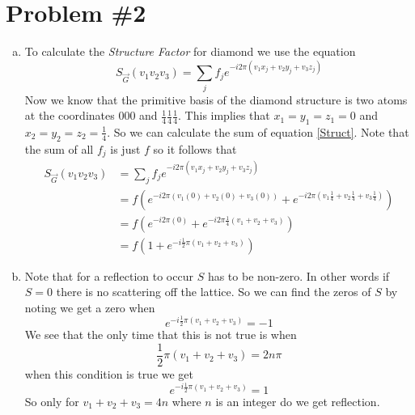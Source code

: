 \documentclass[11pt]{article}
\numberwithin{equation}{section}
\begin{document}
\section{Problem \#2}
\begin{enumerate}[(a)]
\item
To calculate the \emph{Structure Factor} for diamond we use the equation
\begin{equation}
S_{\vec{G}}(v_1v_2v_3) = \sum_{j}f_je^{-i2\pi(v_1x_j+v_2y_j+v_3z_j)}
\label{Struct}
\end{equation}
Now we know that the primitive basis of the diamond structure is two atoms at the coordinates $000$ and $\frac{1}{4}\frac{1}{4}\frac{1}{4}$. This implies that $x_1=y_1=z_1=0$ and $x_2=y_2=z_2=\frac{1}{4}$. So we can calculate the sum of equation \ref{Struct}. Note that the sum of all $f_j$ is just $f$ so it follows that
\begin{align*}
S_{\vec{G}}(v_1v_2v_3) &= \sum_{j}f_je^{-i2\pi(v_1x_j+v_2y_j+v_3z_j)}\\
&= f\left(e^{-i2\pi(v_1(0)+v_2(0)+v_3(0))} + e^{-i2\pi(v_1\frac{1}{4}+v_2\frac{1}{4}+v_3\frac{1}{4})}\right)\\
&= f\left(e^{-i2\pi(0)} + e^{-i2\pi\frac{1}{4}(v_1+v_2+v_3)}\right)\\
&= f\left(1 + e^{-i\frac{1}{2}\pi(v_1+v_2+v_3)}\right)
\end{align*}

\item
Note that for a reflection to occur $S$ has to be non-zero. In other words if $S=0$ there is no scattering off the lattice. So we can find the zeros of $S$ by noting we get a zero when 
$$e^{-i\frac{1}{2}\pi(v_1+v_2+v_3)} = -1$$
We see that the only time that this is not true is when 
$$\frac{1}{2}\pi(v_1+v_2+v_3) = 2n\pi$$
when this condition is true we get
$$e^{-i\frac{1}{2}\pi(v_1+v_2+v_3)} = 1$$
So only for $v_1+v_2+v_3 = 4n$ where $n$ is an integer do we get reflection.
\end{enumerate}
\end{document}
